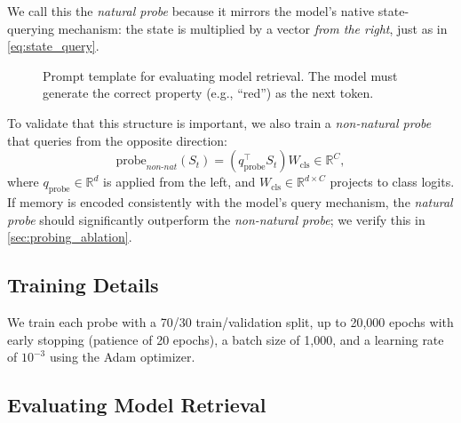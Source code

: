 \documentclass[11pt]{article}
\begin{document}
We call this the \textit{natural probe} because it mirrors the model's native state-querying mechanism: the state is multiplied by a vector \emph{from the right}, just as in \cref{eq:state_query}.

\begin{figure}[t]
    \centering
    \small
    \caption{Prompt template for evaluating model retrieval. The model must generate the correct property (e.g., ``red'') as the next token.}
    \label{fig:prompt_template}
\end{figure}

To validate that this structure is important, we also train a \textit{non-natural probe} that queries from the opposite direction:
\begin{equation}
    \text{probe}_{\textit{non-nat}}(S_t) = (q_{\text{probe}}^\top S_t) W_{\text{cls}} \in \mathbb{R}^{C},
    \label{eq:probe_wrong}
\end{equation}
where $q_{\text{probe}} \in \mathbb{R}^{d}$ is applied from the left, and $W_{\text{cls}} \in \mathbb{R}^{d \times C}$ projects to class logits. If memory is encoded consistently with the model's query mechanism, the \textit{natural probe} should significantly outperform the \textit{non-natural probe}; we verify this in \cref{sec:probing_ablation}.

\subsection{Training Details}
\label{sec:training_details}

We train each probe with a 70/30 train/validation split, up to 20{,}000 epochs with early stopping (patience of 20 epochs), a batch size of 1{,}000, and a learning rate of $10^{-3}$ using the Adam optimizer.

\subsection{Evaluating Model Retrieval}
\label{sec:model_retrieval}
\end{document}
